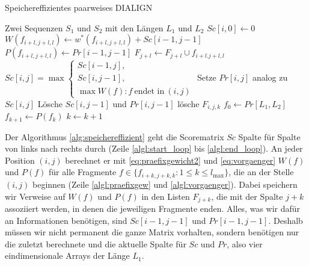 \begin{algorithm}[H]
	\caption{Speichereffizientes paarweises DIALIGN}
	\label{alg:speichereffizient}
	\begin{algorithmic}[1]
		
		\Require Zwei Sequenzen $S_1$ und $S_2$ mit den Längen $L_1$ und $L_2$
		\State $Sc[i,0] \gets 0$
		\EndFor
		\label{algl:start_loop}
		\label{algl:fragmentgewichte}
		\State $W(f_{i+l,j+l,l}) \gets w^*(f_{i+l,j+l,l}) + Sc[i\!-\!1,j\!-\!1]$\label{algl:praefixgew}
		\State $P(f_{i+l,j+l,l}) \gets Pr[i\!-\!1,j\!-\!1]$\label{algl:vorgaenger}
		\State $F_{j+l} \gets F_{j+l} \cup {f_{i+l.j+l,l}}$\label{algl:fragmentliste}
		\EndFor
		\State
		$Sc[i,j] = \max
		\begin{cases}
		Sc[i\!-\!1,j], \\
		Sc[i,j\!-\!1], \\
		\max{W(f): f\: \text{endet in}\: (i,j)}
		\end{cases}$\label{algl:praefix}
		\State Setze $Pr[i,j]$ analog zu $Sc[i,j]$
		\State Lösche $Sc[i,j\!-\!1]$ und $Pr[i,j\!-\!1]$\label{algl:del_frags}
		\State lösche $F_{i,j,k}$
		\EndFor
		\EndFor
		\EndFor\label{algl:end_loop}
		\State $f_0 \gets Pr[L_1,L_2]$
		\State $f_{k+1} \gets P(f_{k})$
		\State $k \gets k+1$
		\EndWhile 
		\EndProcedure
	\end{algorithmic}
\end{algorithm}

Der Algorithmus \ref{alg:speichereffizient} geht die Scorematrix $Sc$ Spalte für Spalte von links nach rechts durch (Zeile \ref{algl:start_loop} bis \ref{algl:end_loop}). An jeder Position $(i,j)$ berechnet er mit \eqref{eq:praefixgewicht2} und \eqref{eq:vorgaenger} $W(f)$ und $P(f)$ für alle Fragmente $f \in \{f_{i+k,j+k,k} : 1 \leq k \leq l_{\max}\}$, die an der Stelle $(i,j)$ beginnen (Zeile \ref{algl:praefixgew} und \ref{algl:vorgaenger}). Dabei speichern wir Verweise auf $W(f)$ und $P(f)$ in den Listen $F_{j+k}$, die mit der Spalte $j+k$ assoziiert werden, in denen die jeweiligen Fragmente enden. Alles, was wir dafür an Informationen benötigen, sind $Sc[i\!-\!1,j\!-\!1]$ und $Pr[i\!-\!1,j\!-\!1]$. Deshalb müssen wir nicht permanent die ganze Matrix vorhalten, sondern benötigen nur die zuletzt berechnete und die aktuelle Spalte für $Sc$ und $Pr$, also vier eindimensionale Arrays der Länge $L_1$.

